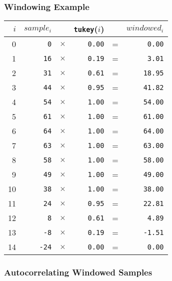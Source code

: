 \subsubsection{Windowing Example}
{
\begin{tabular}{r|rcrcr}
$i$ & $sample_i$ & & \texttt{tukey}($i$) & & $windowed_i$ \\
\hline
0 & \texttt{0} & $\times$ & \texttt{0.00} & = & \texttt{0.00} \\
1 & \texttt{16} & $\times$ & \texttt{0.19} & = & \texttt{3.01} \\
2 & \texttt{31} & $\times$ & \texttt{0.61} & = & \texttt{18.95} \\
3 & \texttt{44} & $\times$ & \texttt{0.95} & = & \texttt{41.82} \\
4 & \texttt{54} & $\times$ & \texttt{1.00} & = & \texttt{54.00} \\
5 & \texttt{61} & $\times$ & \texttt{1.00} & = & \texttt{61.00} \\
6 & \texttt{64} & $\times$ & \texttt{1.00} & = & \texttt{64.00} \\
7 & \texttt{63} & $\times$ & \texttt{1.00} & = & \texttt{63.00} \\
8 & \texttt{58} & $\times$ & \texttt{1.00} & = & \texttt{58.00} \\
9 & \texttt{49} & $\times$ & \texttt{1.00} & = & \texttt{49.00} \\
10 & \texttt{38} & $\times$ & \texttt{1.00} & = & \texttt{38.00} \\
11 & \texttt{24} & $\times$ & \texttt{0.95} & = & \texttt{22.81} \\
12 & \texttt{8} & $\times$ & \texttt{0.61} & = & \texttt{4.89} \\
13 & \texttt{-8} & $\times$ & \texttt{0.19} & = & \texttt{-1.51} \\
14 & \texttt{-24} & $\times$ & \texttt{0.00} & = & \texttt{0.00} \\
\end{tabular}
}

\clearpage

\subsubsection{Autocorrelating Windowed Samples}
\EALGORITHM

